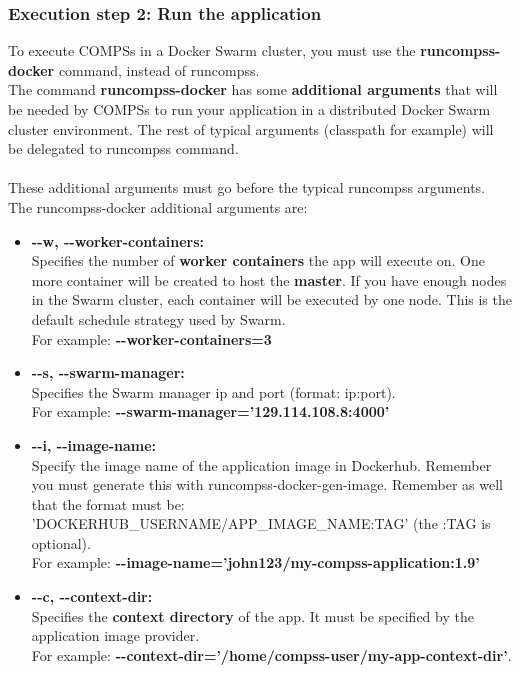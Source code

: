 \subsubsection{Execution step 2: Run the application}
To execute COMPSs in a Docker Swarm cluster, you must use the \textbf{runcompss-docker} command, instead of runcompss.
\\
The command \textbf{runcompss-docker} has some \textbf{additional arguments} that will be needed by COMPSs to run your application 
in a distributed Docker Swarm cluster environment.
The rest of typical arguments (classpath for example) will be delegated to runcompss command.
\\ \\
These additional arguments must go before the typical runcompss arguments. 
The runcompss-docker additional arguments are:
\begin{itemize}
 \item { 
 \textbf{-{}-w, -{}-worker-containers:} \\  
 Specifies the number of \textbf{worker containers} the app will execute on. One more container will be created to host the \textbf{master}. 
 If you have enough nodes in the Swarm cluster, each container will be executed by one node. This is the default schedule strategy used by Swarm. \\
 For example:  \textbf{-{}-worker-containers=3}
 }
 
 \item { 
 \textbf{-{}-s, -{}-swarm-manager:} \\
 Specifies the Swarm manager ip and port (format: ip:port). \\
 For example: \textbf{-{}-swarm-manager='129.114.108.8:4000'}
 }
 
 \item { 
 \textbf{-{}-i, -{}-image-name:} \\
 Specify the image name of the application image in Dockerhub. Remember you must generate this with runcompss-docker-gen-image.
 Remember as well that the format must be: 'DOCKERHUB\_USERNAME/APP\_IMAGE\_NAME:TAG' (the :TAG is optional). \\
 For example: \textbf{-{}-image-name='john123/my-compss-application:1.9'}
 }
                                 
 \item { 
 \textbf{-{}-c, -{}-context-dir:} \\
 Specifies the \textbf{context directory} of the app. It must be specified by the application image provider. \\
 For example: \textbf{-{}-context-dir='/home/compss-user/my-app-context-dir'}.
 }
\end{itemize}


